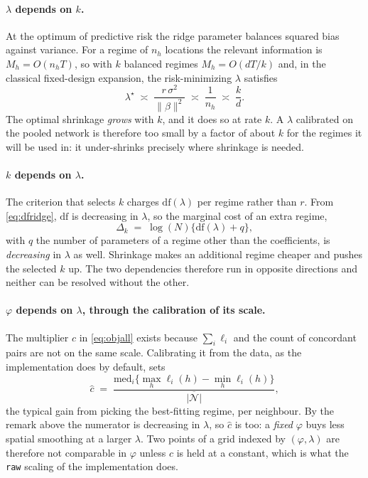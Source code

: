 \documentclass[11pt,a4paper]{article}
\begin{document}
\paragraph{$\lambda$ depends on $k$.} At the optimum of predictive risk the
ridge parameter balances squared bias against variance. For a regime of $n_h$
locations the relevant information is $M_h = O(n_h T)$, so with $k$ balanced
regimes $M_h = O(dT/k)$ and, in the classical fixed-design expansion, the
risk-minimizing $\lambda$ satisfies
\begin{equation}
  \lambda^\star \;\asymp\;
  \frac{r\,\sigma^2}{\|\beta\|^2}\; \asymp\; \frac{1}{n_h}
  \;\asymp\; \frac{k}{d} .
  \label{eq:lamk}
\end{equation}
The optimal shrinkage \emph{grows} with $k$, and it does so at rate $k$. A
$\lambda$ calibrated on the pooled network is therefore too small by a factor
of about $k$ for the regimes it will be used in: it under-shrinks precisely
where shrinkage is needed.

\paragraph{$k$ depends on $\lambda$.} The criterion that selects $k$ charges
$\mathrm{df}(\lambda)$ per regime rather than $r$. From
\eqref{eq:dfridge}, $\mathrm{df}$ is decreasing in $\lambda$, so the marginal
cost of an extra regime,
\begin{equation}
  \Delta_k \;=\; \log(N)\bigl\{ \mathrm{df}(\lambda) + q \bigr\},
  \label{eq:margk}
\end{equation}
with $q$ the number of parameters of a regime other than the coefficients, is
\emph{decreasing} in $\lambda$ as well. Shrinkage makes an additional regime
cheaper and pushes the selected $k$ up. The two dependencies therefore run in
opposite directions and neither can be resolved without the other.

\paragraph{$\varphi$ depends on $\lambda$, through the calibration of its
scale.} The multiplier $c$ in \eqref{eq:objall} exists because
$\sum_i \ell_i$ and the count of concordant pairs are not on the same scale.
Calibrating it from the data, as the implementation does by default, sets
\begin{equation}
  \hat c \;=\;
  \frac{\mathrm{med}_i\bigl\{ \max_h \ell_i(h) - \min_h \ell_i(h) \bigr\}}
       {\overline{|\mathcal{N}|}} ,
  \label{eq:cscale}
\end{equation}
the typical gain from picking the best-fitting regime, per neighbour. By the
remark above the numerator is decreasing in $\lambda$, so $\hat c$ is too: a
\emph{fixed} $\varphi$ buys less spatial smoothing at a larger $\lambda$. Two
points of a grid indexed by $(\varphi,\lambda)$ are therefore not comparable in
$\varphi$ unless $c$ is held at a constant, which is what the \texttt{raw}
scaling of the implementation does.
\end{document}
